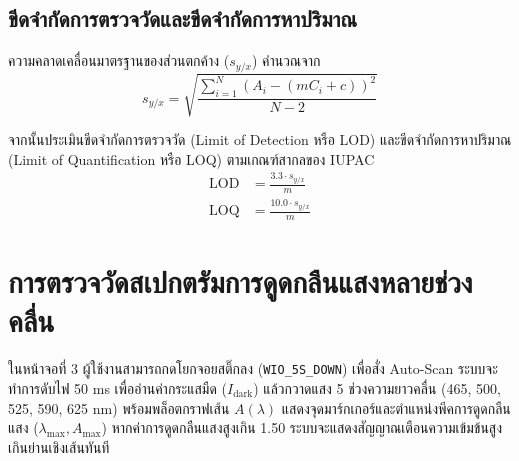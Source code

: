 \subsection{ขีดจำกัดการตรวจวัดและขีดจำกัดการหาปริมาณ}
ความคลาดเคลื่อนมาตรฐานของส่วนตกค้าง ($s_{y/x}$) คำนวณจาก
\begin{equation}
    s_{y/x} = \sqrt{\frac{\sum_{i=1}^N \left(A_i - (m C_i + c)\right)^2}{N - 2}}
\end{equation}

จากนั้นประเมินขีดจำกัดการตรวจวัด (Limit of Detection หรือ LOD) และขีดจำกัดการหาปริมาณ (Limit of Quantification หรือ LOQ) ตามเกณฑ์สากลของ IUPAC
\begin{align}
    \text{LOD} &= \frac{3.3 \cdot s_{y/x}}{m} \\
    \text{LOQ} &= \frac{10.0 \cdot s_{y/x}}{m}
\end{align}

\section{การตรวจวัดสเปกตรัมการดูดกลืนแสงหลายช่วงคลื่น}
ในหน้าจอที่ 3 ผู้ใช้งานสามารถกดโยกจอยสติ๊กลง (\texttt{WIO\_5S\_DOWN}) เพื่อสั่ง Auto-Scan ระบบจะทำการดับไฟ 50 ms เพื่ออ่านค่ากระแสมืด ($I_{\text{dark}}$) แล้วกวาดแสง 5 ช่วงความยาวคลื่น (465, 500, 525, 590, 625 nm) พร้อมพล็อตกราฟเส้น $A(\lambda)$ แสดงจุดมาร์กเกอร์และตำแหน่งพีคการดูดกลืนแสง ($\lambda_{\max}, A_{\max}$) หากค่าการดูดกลืนแสงสูงเกิน 1.50 ระบบจะแสดงสัญญาณเตือนความเข้มข้นสูงเกินย่านเชิงเส้นทันที

